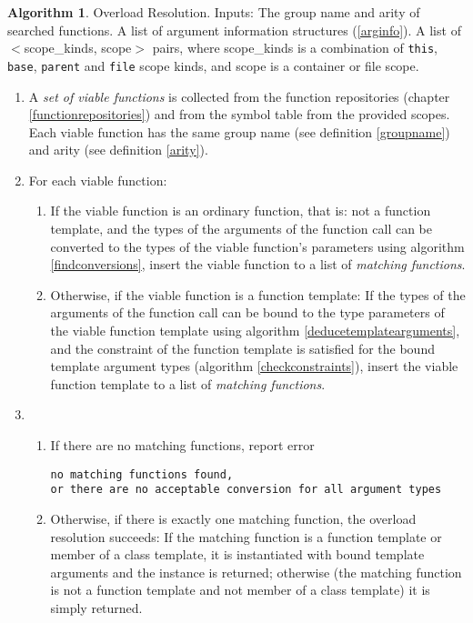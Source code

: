 \documentclass[a4paper,oneside,11pt]{book}
\theoremstyle{definition}
\newtheorem{algo}{Algorithm}[section]
\begin{document}
\begin{algo} Overload Resolution\label{resolveoverload}. Inputs: The group name and arity of searched functions.
A list of argument information structures (\ref{arginfo}). A list of $<$scope\_kinds, scope$>$ pairs,
where scope\_kinds is a combination of \verb|this|, \verb|base|, \verb|parent| and \verb|file| scope kinds, and scope is a container or file scope.
\begin{enumerate}
\item
A \emph{set of viable functions} is collected from the function repositories (chapter \ref{functionrepositories}) and from the symbol table from the
provided scopes. Each viable function has the same group name (see definition \ref{groupname}) and arity (see definition \ref{arity}).
\item
For each viable function:
\begin{enumerate}
\item
If the viable function is an ordinary function, that is: not a function template,
and the types of the arguments of the function call can be converted to the types of the viable function's parameters using algorithm \ref{findconversions},
insert the viable function to a list of \emph{matching functions}.
\item
Otherwise, if the viable function is a function template:
If the types of the arguments of the function call can be bound to the type parameters of the viable function template using
algorithm \ref{deducetemplatearguments}, and
the constraint of the function template is satisfied for the bound template argument types (algorithm \ref{checkconstraints}),
insert the viable function template to a list of \emph{matching functions}.
\end{enumerate}
\item
\begin{enumerate}
\item
If there are no matching functions, report error\\
\begin{verbatim}
no matching functions found,
or there are no acceptable conversion for all argument types
\end{verbatim}
\item
Otherwise, if there is exactly one matching function, the overload resolution succeeds:
If the matching function is a function template or member of a class template, it is instantiated with bound template arguments and the instance is returned;
otherwise (the matching function is not a function template and not member of a class template) it is simply returned.

\end{enumerate}
\end{enumerate}
\end{algo}
\end{document}
